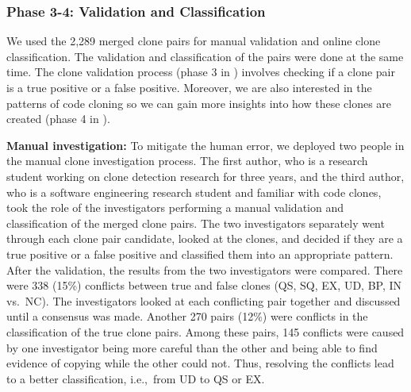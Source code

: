 \documentclass[10pt,journal,compsoc]{IEEEtran}
\begin{document}
\subsubsection{Phase 3-4: Validation and Classification}
We used the 2,289 merged clone pairs for
manual validation and online clone classification.
The validation and classification of the pairs were done at the same time. 
The clone validation process (phase 3 in ) involves checking 
if a clone pair is a true positive or a false positive. 
Moreover, we are also interested in 
the patterns of code cloning so we can gain more insights into 
how these clones are created (phase 4 in ). 

\textbf{Manual investigation:} 
To mitigate the human error, we deployed two people in the manual clone
investigation process. The first author, who is a research student working on
clone detection research for three years, and the third author, who is a
software engineering research student and familiar with code clones, took the
role of the investigators performing a manual validation and classification of
the merged clone pairs. The two investigators separately went through each clone
pair candidate, looked at the clones, and decided if they are a true positive or
a false positive and classified them into an appropriate pattern. After the
validation, the results from the two investigators were compared. 
There were 338 (15\%) conflicts between 
true and false clones (QS, SQ, EX, UD, BP, IN vs.~NC).
The investigators looked at each conflicting pair together and
discussed until a consensus was made. 
Another 270 pairs (12\%) were
conflicts in the classification of
the true clone pairs. Among these pairs, 145 conflicts were caused by
one investigator being more careful than the other and being able to find evidence of 
copying while the other could not. Thus, resolving the conflicts lead to a better classification,
 i.e.,~from UD to QS or EX.

\end{document}
